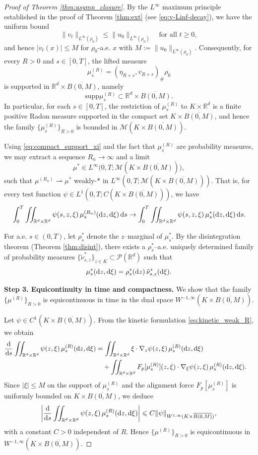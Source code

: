 \documentclass[10pt,reqno]{amsart}
\renewcommand{\ge}{\geqslant}
\renewcommand{\le}{\leqslant}
\numberwithin{equation}{section}
\newcommand{\R}{\mathbb R}
\newcommand{\bq}{\begin{equation}}
\newcommand{\eq}{\end{equation}}
\newcommand{\lt}{\left}
\newcommand{\rt}{\right}
\newcommand{\intr}{\int_{\R^d}}
\newcommand{\intrr}{\iint_{\R^d \times \R^d}}
\newcommand{\calM}{\mathcal M}
\newcommand{\calP}{\mathcal P}
\newcommand{\rd}{\textnormal{d}}
\newcommand{\dz}{\textnormal{d}z}
\newcommand{\ds}{\textnormal{d}s}
\newcommand{\supp}{\text{supp}}
\begin{document}
\begin{proof}[Proof of Theorem \ref{thm:asymp_closure}]
By the $L^\infty$ maximum principle established in the proof of Theorem \ref{thm:ext} (see \eqref{eq:v-Linf-decay}), we have the uniform bound
\[%
\|v_t\|_{L^\infty(\rho_0)} \le \|u_0\|_{L^\infty(\rho_0)}
\quad\text{for all } t\ge0,
\]%
and hence $|v_t(x)|\le M$ for $\rho_0$-a.e.  $x$ with $M:=\|u_0\|_{L^\infty(\rho_0)}$. Consequently, for every $R>0$ and $s\in[0,T]$, the lifted measure
\[
\mu^{(R)}_s=(\eta_{R+s},v_{R+s})_\#\rho_0
\]
is supported in $\R^d\times\overline{B(0,M)}$, namely
\bq\label{eq:compact_support_xi}
\supp\mu^{(R)}_s \subset \R^d\times\overline{B(0,M)} .
\eq
In particular, for each $s\in[0,T]$, the restriction of $\mu^{(R)}_s$ to $K\times\R^d$ is a finite positive Radon measure supported in the compact set $K\times\overline{B(0,M)}$, and hence the family $\{\mu^{(R)}_s\}_{R>0}$ is bounded in $\calM(K\times\overline{B(0,M)})$.

Using \eqref{eq:compact_support_xi} and the fact that $\mu^{(R)}_s$ are probability measures, we may extract a sequence $R_n\to\infty$ and a limit
\[
\mu^\ast \in L^\infty\bigl(0,T;\calM(K\times\overline{B(0,M)})\bigr), 
\]
such that $\mu^{(R_n)}\rightharpoonup\mu^\ast$ weakly-$\ast$ in $L^\infty (0,T;\calM(K\times\overline{B(0,M)}) )$. That is, for every test function
$\psi\in L^1(0,T;C(K\times\overline{B(0,M)}))$, we have
\[%
\int_0^T \intrr \psi(s,z,\xi)\,\mu^{(R_n)}_s(\dz,\rd\xi)\,\ds \to \int_0^T \intrr \psi(s,z,\xi)\,\mu^\ast_s(\dz,\rd\xi)\,\ds.
\]%

For a.e.  $s\in(0,T)$, let $\rho^\ast_s$ denote the $z$--marginal of $\mu^\ast_s$. By the disintegration theorem (Theorem \ref{thm:disint}), there exists a $\rho^\ast_s$--a.e.  uniquely determined family of probability measures $\{\tilde\nu^\ast_{s,z}\}_{z\in K}\subset\calP(\R^d)$ such that
\[
\mu^\ast_s(\dz,\rd\xi)=\rho^\ast_s(\dz)\,\tilde\nu^\ast_{s,z}(\rd\xi).
\]

\medskip
\noindent\textbf{Step 3. Equicontinuity in time and compactness.} We show that the family $\{\mu^{(R)}\}_{R>0}$ is equicontinuous in time in the dual space $W^{-1,\infty}(K\times\overline{B(0,M)})$.

Let $\psi\in C^1(K\times\overline{B(0,M)})$. From the kinetic formulation \eqref{eq:kinetic_weak_R}, we obtain
\begin{align*}
\frac{\rd}{\rd s}\intrr\psi(z,\xi)\,\mu^{(R)}_s(\dz,\rd\xi) &= \intrr \xi\cdot\nabla_z\psi(z,\xi)\,\mu^{(R)}_s(\dz,\rd\xi)\cr
&\quad + \intrr F_p[\mu^{(R)}_s](z,\xi)\cdot\nabla_\xi\psi(z,\xi)\,\mu^{(R)}_s(\dz,\rd\xi).
\end{align*}
Since $|\xi|\le M$ on the support of $\mu^{(R)}_s$ and the alignment force 
$F_p[\mu^{(R)}_s]$ is uniformly bounded on $K\times\overline{B(0,M)}$, we deduce
\[
\lt|\frac{\rd}{\rd s}\intrr\psi(z,\xi)\,\mu^{(R)}_s(\dz,\rd\xi) \rt|
\le C\|\psi\|_{W^{1,\infty}(K\times\overline{B(0,M)})},
\]
with a constant $C >0$ independent of $R$.  Hence $\{\mu^{(R)}\}_{R>0}$ is equicontinuous in  $W^{-1,\infty}(K\times\overline{B(0,M)})$.


\end{proof}
\end{document}
